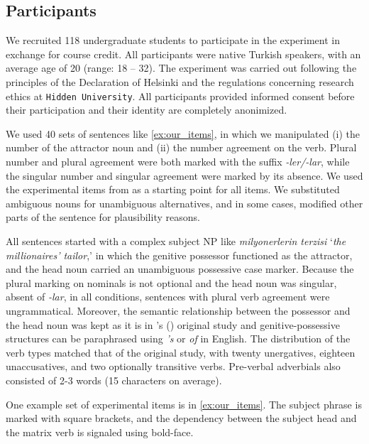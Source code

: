 \documentclass[apacite,linguex]{glossa}\usepackage[]{graphicx}\usepackage[]{color}
\begin{document}
\subsection{Participants} 


We recruited 118 undergraduate students to participate in the experiment in exchange for course credit. All participants were native Turkish speakers, with an average age of 20 (range: 18 -- 32). The experiment was carried out following the principles of the Declaration of Helsinki and the regulations concerning research ethics at \texttt{Hidden University}. All participants provided informed consent before their participation and their identity are completely anonimized.


We used 40 sets of sentences like \ref{ex:our_items}, in which we manipulated (i) the number of the attractor noun and (ii) the number agreement on the verb. Plural number and plural agreement were both marked with the suffix \textit{-ler/-lar}, while the singular number and singular agreement were marked by its absence. We used the experimental items from \citet{LagoEtAl:2019} as a starting point for all items. We substituted ambiguous nouns for unambiguous alternatives, and in some cases, modified other parts of the sentence for plausibility reasons.

All sentences started with a complex subject NP like \textit{milyonerlerin terzisi} `\textit{the millionaires' tailor},' in which the genitive possessor functioned as the attractor, and the head noun carried an unambiguous possessive case marker. Because the plural marking on nominals is not optional and the head noun was singular, absent of \textit{-lar}, in all conditions, sentences with plural verb agreement were ungrammatical. Moreover, the semantic relationship between the possessor and the head noun was kept as it is in \citeauthor{LagoEtAl:2019}'s (\citeyear{LagoEtAl:2019}) original study and genitive-possessive structures can be paraphrased using \textit{'s} or \textit{of} in English. The distribution of the verb types matched that of the original study, with twenty unergatives, eighteen unaccusatives, and two optionally transitive verbs. Pre-verbal adverbials also consisted of 2-3 words (15 characters on average).

One example set of experimental items is in \ref{ex:our_items}. The subject phrase is marked with square brackets, and the dependency between the subject head and the matrix verb is signaled using bold-face.
\end{document}
